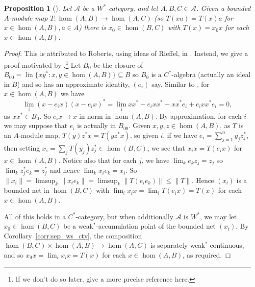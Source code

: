\documentclass[a4paper,11pt]{article}
\theoremstyle{plain}
\newtheorem{proposition}{Proposition}[section]
\theoremstyle{remark}
\newcommand{\mc}[1]{\mathcal{#1}}
\newcommand{\lin}{\operatorname{lin}}
\begin{document}
\begin{proposition}[{\cite[Proposition~2.14]{GLR_Wstar_categories}}]\label{prop:Wstar_means_hom_selfdual}
Let $\mc A$ be a $W^*$-category, and let $A,B,C \in \mc A$.  Given a bounded $A$-module map $T\colon\hom(A,B) \to \hom(A,C)$ (so $T(xa) = T(x)a$ for $x\in\hom(A,B), a\in A$) there is $x_0 \in \hom(B,C)$ with $T(x) = x_0 x$ for each $x\in\hom(A,B)$.
\end{proposition}
\begin{proof}
This is attributed to Roberts, using ideas of Rieffel, in \cite{GLR_Wstar_categories}.  Instead, we give a proof motivated by \cite[Lemma~8.5.4]{BlecherLeMerdy_Book}.\footnote{If we don't do so later, give a more precise reference here.}
Let $B_0$ be the closure of $B_{00} = \lin\{ x y^* : x,y\in \hom(A,B) \} \subseteq B$ so $B_0$ is a $C^*$-algebra (actually an ideal in $B$) and so has an approximate identity, $(e_i)$ say.  Similar to \cite[page~5]{Lance_HilbModsBook}, for $x\in\hom(A,B)$ we have
\[ \lim_i (x - e_i x)(x - e_i x)^*
= \lim_i xx^* - e_i xx^* - xx^*e_i + e_ixx^*e_i = 0, \]
as $xx^*\in B_0$.  So $e_ix \to x$ in norm in $\hom(A,B)$.  By approximation, for each $i$ we may suppose that $e_i$ is actually in $B_{00}$.  Given $x,y,z\in\hom(A,B)$, as $T$ is an $A$-module map, $T(y)z^* x = T(yz^*x)$, so given $i$, if we have $e_i = \sum_{j=1}^n y_j z_j^*$, then setting $x_i = \sum_j T(y_j) z_j^* \in \hom(B,C)$, we see that $x_i x = T(e_ix)$ for $x\in\hom(A,B)$.  Notice also that for each $j$, we have $\lim_k e_k z_j = z_j$ so $\lim_k z_j^* e_k = z_j^*$ and hence $\lim_k x_i e_k = x_i$.  So $\|x_i\| = \limsup_k \|x_i e_k\| = \limsup_k \|T(e_i e_k)\| \leq \|T\|$.  Hence $(x_i)$ is a bounded net in $\hom(B,C)$ with $\lim_i x_i x = \lim_i T(e_ix) = T(x)$ for each $x\in\hom(A,B)$.

All of this holds in a $C^*$-category, but when additionally $\mc A$ is $W^*$, we may let $x_0 \in \hom(B,C)$ be a weak$^*$-accumulation point of the bounded net $(x_i)$.  By Corollary~\ref{corr:sep_ws_cty}, the composition $\hom(B,C) \times \hom(A,B) \to \hom(A,C)$ is separately weak$^*$-continuous, and so $x_0 x = \lim_i x_i x = T(x)$ for each $x\in\hom(A,B)$, as required.
\end{proof}
\end{document}
